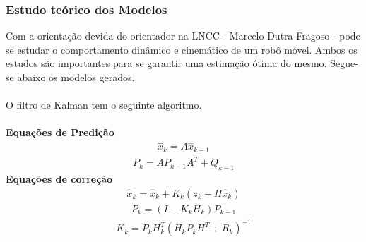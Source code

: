 \documentclass[11pt,a4paper]{article}
\begin{document}
\subsubsection{Estudo teórico dos Modelos}
\hspace{1.5cm}Com a orientação devida do orientador na LNCC - Marcelo Dutra Fragoso - pode se estudar o comportamento dinâmico e cinemático de um robô móvel. Ambos os estudos são importantes para se garantir uma estimação ótima do mesmo. Segue-se abaixo os modelos gerados.
\\\\
O filtro de Kalman tem o seguinte algoritmo.\\\\
\textbf{Equações de Predição}
\begin{align}
\hat{x}_{k}=A\hat{x}_{k-1} \tag{2.1}
\end{align}
\begin{align}
P_{k}=AP_{k-1}A^{T} + Q_{k-1} \tag{2.2}
\end{align}
\textbf{Equações de correção}
\begin{align}
\hat{x}_{k}=\hat{x}_{k} + K_{k}(z_{k} - H\hat{x}_k) \tag{2.3}
\end{align}
\begin{align}
P_{k}=(I-K_{k}H_k)P_{k-1} \tag{2.4}
\end{align}
\begin{align}
K_k=P_kH^{T}_{k}(H_kP_{k}H^{T}+R_{k})^{-1} \tag{2.5}
\end{align}
\\
\end{document}
